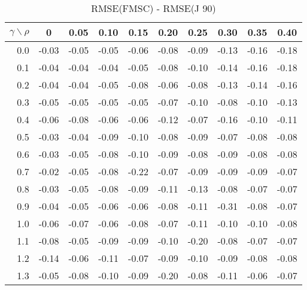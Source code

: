 \documentclass[12pt]{article}
\begin{document}
\begin{table}[!tbp]
\caption{RMSE(FMSC) - RMSE(J 90)}
 \begin{center}
 \begin{tabular}{r|rrrrrrrrr}\hline\hline
\multicolumn{1}{c|}{$\gamma\backslash\rho$}&\multicolumn{1}{c}{0}&\multicolumn{1}{c}{0.05}&\multicolumn{1}{c}{0.10}&\multicolumn{1}{c}{0.15}&\multicolumn{1}{c}{0.20}&\multicolumn{1}{c}{0.25}&\multicolumn{1}{c}{0.30}&\multicolumn{1}{c}{0.35}&\multicolumn{1}{c}{0.40}\tabularnewline
\hline

0.0&-0.03&-0.05&-0.05&-0.06&-0.08&-0.09&-0.13&-0.16&-0.18\tabularnewline
0.1&-0.04&-0.04&-0.04&-0.05&-0.08&-0.10&-0.14&-0.16&-0.18\tabularnewline
0.2&-0.04&-0.04&-0.05&-0.08&-0.06&-0.08&-0.13&-0.14&-0.16\tabularnewline
0.3&-0.05&-0.05&-0.05&-0.05&-0.07&-0.10&-0.08&-0.10&-0.13\tabularnewline
0.4&-0.06&-0.08&-0.06&-0.06&-0.12&-0.07&-0.16&-0.10&-0.11\tabularnewline
0.5&-0.03&-0.04&-0.09&-0.10&-0.08&-0.09&-0.07&-0.08&-0.08\tabularnewline
0.6&-0.03&-0.05&-0.08&-0.10&-0.09&-0.08&-0.09&-0.08&-0.08\tabularnewline
0.7&-0.02&-0.05&-0.08&-0.22&-0.07&-0.09&-0.09&-0.09&-0.07\tabularnewline
0.8&-0.03&-0.05&-0.08&-0.09&-0.11&-0.13&-0.08&-0.07&-0.07\tabularnewline
0.9&-0.04&-0.05&-0.06&-0.06&-0.08&-0.11&-0.31&-0.08&-0.07\tabularnewline
1.0&-0.06&-0.07&-0.06&-0.08&-0.07&-0.11&-0.10&-0.10&-0.08\tabularnewline
1.1&-0.08&-0.05&-0.09&-0.09&-0.10&-0.20&-0.08&-0.07&-0.07\tabularnewline
1.2&-0.14&-0.06&-0.11&-0.07&-0.09&-0.10&-0.09&-0.08&-0.08\tabularnewline
1.3&-0.05&-0.08&-0.10&-0.09&-0.20&-0.08&-0.11&-0.06&-0.07\tabularnewline
\hline
\end{tabular}

\end{center}

\end{table}

%
\end{document}
